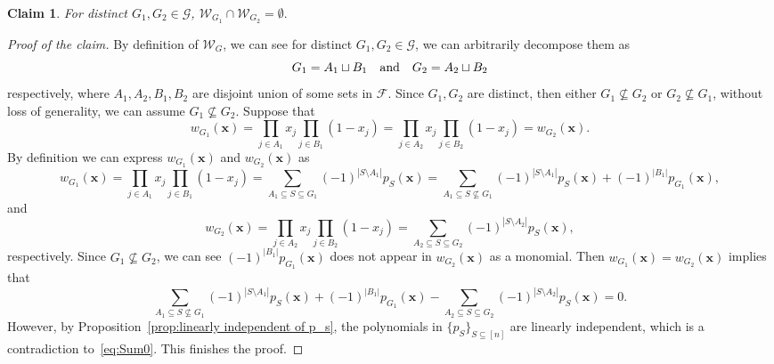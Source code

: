 \documentclass[11pt]{article}
\newtheorem{claim}[theorem]{Claim}
\theoremstyle{definition}
\newenvironment{poc}{\begin{proof}[Proof of the claim]\renewcommand*{\qedsymbol}{$\blacksquare$}}{\end{proof}}
\begin{document}
\begin{claim}
    For distinct \(G_{1},G_{2}\in\mathcal{G}\), \(\mathcal{W}_{G_{1}}\cap \mathcal{W}_{G_{2}}=\emptyset.\)
\end{claim}
\begin{poc}
By definition of \(\mathcal{W}_{G}\), we can see for distinct \(G_{1},G_{2}\in\mathcal{G}\), we can arbitrarily decompose them as
\[
G_{1}=A_{1}\sqcup B_{1}\quad \textup{and}\quad G_{2}=A_{2}\sqcup B_{2}
\]
respectively, where \(A_{1},A_{2},B_{1},B_{2}\) are disjoint union of some sets in \(\mathcal{F}.\) Since \(G_{1},G_{2}\) are distinct, then either \(G_{1}\nsubseteq G_{2}\) or \(G_{2}\nsubseteq G_{1}\), without loss of generality, we can assume \(G_{1}\nsubseteq G_{2}\).
Suppose that
\[
w_{G_{1}}(\bm{x})=\prod_{j\in A_1}x_j\prod_{j\in B_1}(1-x_j)=\prod_{j\in A_2}x_j\prod_{j\in B_2}(1-x_j)=w_{G_{2}}(\bm{x}).
\]
By definition we can express \(w_{G_{1}}(\bm{x})\) and \(w_{G_{2}}(\bm{x})\) as 
\[
w_{G_{1}}(\bm{x})=\prod_{j\in A_1}x_j\prod_{j\in B_1}(1-x_j)=\sum_{A_1\subseteq S\subseteq G_1}(-1)^{|S\setminus A_1|}p_S(\bm{x})=\sum_{A_1\subseteq S\nsubseteq G_1}(-1)^{|S\setminus A_1|}p_S(\bm{x})+(-1)^{|B_1|}p_{G_1}(\bm{x}),
\]
and 
\[
w_{G_{2}}(\bm{x})=\prod_{j\in A_2}x_j\prod_{j\in B_2}(1-x_j)=\sum_{A_2\subseteq S\subseteq G_2}(-1)^{|S\setminus A_2|}p_S(\bm{x}),
\]
respectively. Since \(G_{1}\nsubseteq G_{2}\), we can see \((-1)^{|B_1|}p_{G_1}(\bm{x})\) does not appear in \(w_{G_{2}}(\bm{x})\) as a monomial. Then \(w_{G_{1}}(\bm{x})=w_{G_{2}}(\bm{x})\) implies that
\begin{equation}\label{eq:Sum0}
    \sum_{A_1\subseteq S\nsubseteq G_1}(-1)^{|S\setminus A_1|}p_S(\bm{x})+(-1)^{|B_1|}p_{G_1}(\bm{x})-\sum_{A_2\subseteq S\subseteq G_2}(-1)^{|S\setminus A_2|}p_S(\bm{x})=0.
\end{equation}
However, by Proposition~\ref{prop:linearly independent of p_s}, the polynomials in \(\{p_{S}\}_{S\subseteq [n]}\) are linearly independent, which is a contradiction to~\eqref{eq:Sum0}. This finishes the proof.
\end{poc}
\end{document}
